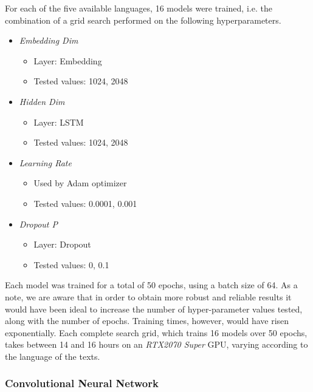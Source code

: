 \documentclass[letterpaper,11pt]{article}
\begin{document}
For each of the five available languages, 16 models were trained, i.e. the combination of a grid search performed on the following hyperparameters.

\begin{itemize}
  \item \textit{Embedding Dim} 
  \begin{itemize}
    \vspace{-0.3em}
    \itemsep-0.35em
    \item Layer: Embedding
    \item Tested values: 1024, 2048 
  \end{itemize}
  \item \textit{Hidden Dim}
  \begin{itemize}
    \vspace{-0.3em}
    \itemsep-0.35em
    \item Layer: LSTM
    \item Tested values: 1024, 2048 
  \end{itemize}
  \item \textit{Learning Rate}
  \begin{itemize}
    \vspace{-0.3em}
    \itemsep-0.35em
    \item Used by Adam optimizer
    \item Tested values: 0.0001, 0.001
  \end{itemize}
  \item \textit{Dropout P}
  \begin{itemize}
    \vspace{-0.3em}
    \itemsep-0.35em
    \item Layer: Dropout
    \item Tested values: 0, 0.1 
  \end{itemize}
\end{itemize}



Each model was trained for a total of 50 epochs, using a batch size of 64. As a note, we are aware that in order to obtain more robust and reliable results it would have been ideal to increase the number of hyper-parameter values tested, along with the number of epochs. Training times, however, would have risen exponentially. Each complete search grid, which trains 16 models over 50 epochs, takes between 14 and 16 hours on an \textit{RTX2070 Super} GPU, varying according to the language of the texts.

\subsubsection*{Convolutional Neural Network}
\end{document}
